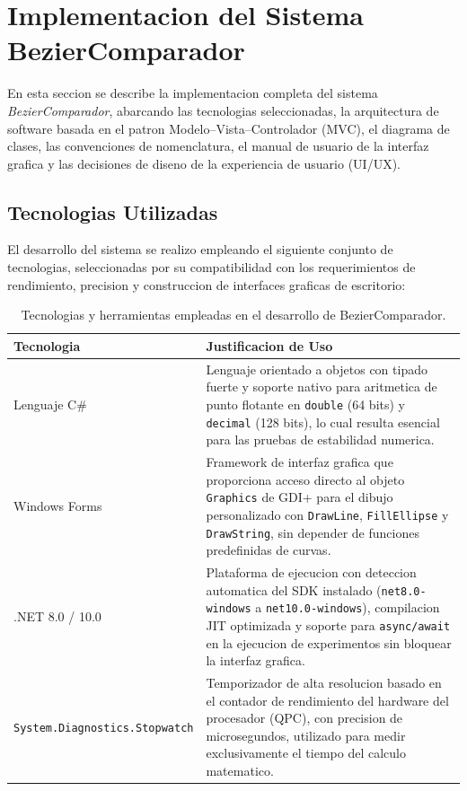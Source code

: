 \section{Implementacion del Sistema BezierComparador}
\label{sec:implementacion}

En esta seccion se describe la implementacion completa del sistema \textit{BezierComparador}, abarcando las tecnologias seleccionadas, la arquitectura de software basada en el patron Modelo--Vista--Controlador (MVC), el diagrama de clases, las convenciones de nomenclatura, el manual de usuario de la interfaz grafica y las decisiones de diseno de la experiencia de usuario (UI/UX).

\subsection{Tecnologias Utilizadas}
\label{subsec:impl_tecnologias}

El desarrollo del sistema se realizo empleando el siguiente conjunto de tecnologias, seleccionadas por su compatibilidad con los requerimientos de rendimiento, precision y construccion de interfaces graficas de escritorio:

\begin{table}[H]
\centering
\caption{Tecnologias y herramientas empleadas en el desarrollo de BezierComparador.}
\label{tab:impl_tecnologias}
\begin{tabular}{p{3.8cm} p{10.5cm}}
\toprule
\textbf{Tecnologia} & \textbf{Justificacion de Uso} \\
\midrule
Lenguaje C\# & Lenguaje orientado a objetos con tipado fuerte y soporte nativo para aritmetica de punto flotante en \texttt{double} (64 bits) y \texttt{decimal} (128 bits), lo cual resulta esencial para las pruebas de estabilidad numerica. \\
\midrule
Windows Forms & Framework de interfaz grafica que proporciona acceso directo al objeto \texttt{Graphics} de GDI+ para el dibujo personalizado con \texttt{DrawLine}, \texttt{FillEllipse} y \texttt{DrawString}, sin depender de funciones predefinidas de curvas. \\
\midrule
.NET 8.0 / 10.0 & Plataforma de ejecucion con deteccion automatica del SDK instalado (\texttt{net8.0-windows} a \texttt{net10.0-windows}), compilacion JIT optimizada y soporte para \texttt{async/await} en la ejecucion de experimentos sin bloquear la interfaz grafica. \\
\midrule
\texttt{System.Diagnostics.Stopwatch} & Temporizador de alta resolucion basado en el contador de rendimiento del hardware del procesador (QPC), con precision de microsegundos, utilizado para medir exclusivamente el tiempo del calculo matematico. \\
\bottomrule
\end{tabular}
\end{table}

